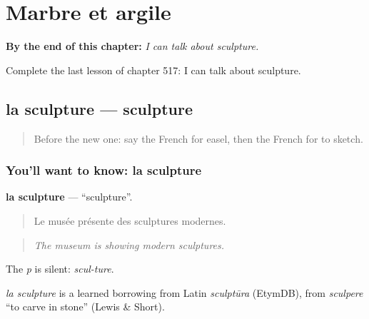 
\chapter{Marbre et argile}
\label{ch:fr-marbre-et-argile}

\begin{chapteropening}
\textbf{By the end of this chapter:} \emph{I can talk about sculpture.}

Complete the last lesson of chapter 517: I can talk about sculpture.
\end{chapteropening}

\section[la sculpture]{la sculpture — sculpture}

\label{lesson:FR-C517-sculpture}



\begin{quote}
Before the new one: say the French for easel, then the French for to sketch.
\end{quote}

\subsection*{You'll want to know: la sculpture}
\textbf{la sculpture} — \textquotedblleft{}sculpture\textquotedblright{}.

\begin{quote}
Le musée présente des sculptures modernes.
\end{quote}

\begin{quote}
\emph{The museum is showing modern sculptures.}
\end{quote}

The \emph{p} is silent: \emph{scul-ture}.

\begin{cousinweb}
\emph{la sculpture} is a learned borrowing from Latin \emph{sculptūra} (EtymDB), from \emph{sculpere} \textquotedblleft{}to carve in stone\textquotedblright{} (Lewis \& Short).
\end{cousinweb}

